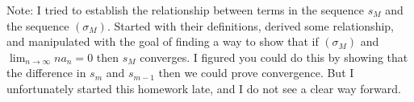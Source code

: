 \documentclass [10pt]{article}
\begin{document}
\begin{enumerate}
{Note: I tried to establish the relationship between terms in the sequence $s_M$ and the sequence $(\sigma_M)$. Started with their definitions, derived some relationship, and manipulated with the goal of finding a way to show that if $(\sigma_M)$ and $\lim_{n\rightarrow \infty} n a_n = 0$ then $s_M$ converges. I figured you could do this by showing that the difference in $s_m$ and $s_{m-1}$ then we could prove convergence. But I unfortunately started this homework late, and I do not see a clear way forward. 

}

\end{enumerate}
\end{document}
